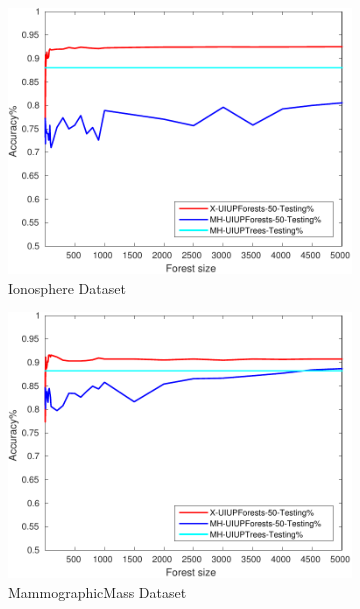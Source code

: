 \begin{figure}[ht]
\begin{subfigure}[b]{0.3\textwidth}
		\centering
  	\includegraphics[width=\textwidth]{figs/PLPTF/Forests/IonosphereDownsampledFurther_Forests_X_MH.pdf}
  	\caption{Ionosphere Dataset}
		\label{fig:I3}
	\end{subfigure}
  \begin{subfigure}[b]{0.3\textwidth}
		\centering
  	\includegraphics[width=\textwidth]{figs/PLPTF/Forests/MammographicMassDownsampled_Forests_X_MH.pdf}
  	\caption{MammographicMass Dataset}
		\label{fig:Mam3}
	\end{subfigure}
	\\
  \begin{subfigure}[b]{0.3\textwidth}
		\centering

\end{subfigure}
\end{figure}
